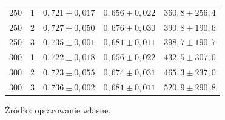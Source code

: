 \begin{table}[H]
{\begin{tabular}{llccc}
250 & 1 & $0{,}721 \pm 0{,}017$ & $0{,}656 \pm 0{,}022$ & $360{,}8 \pm 256{,}4$ \\
250 & 2 & $0{,}727 \pm 0{,}050$ & $0{,}676 \pm 0{,}030$ & $390{,}8 \pm 190{,}6$ \\
250 & 3 & $0{,}735 \pm 0{,}001$ & $0{,}681 \pm 0{,}011$ & $398{,}7 \pm 190{,}7$ \\
300 & 1 & $0{,}722 \pm 0{,}018$ & $0{,}656 \pm 0{,}022$ & $432{,}5 \pm 307{,}0$ \\
300 & 2 & $0{,}723 \pm 0{,}055$ & $0{,}674 \pm 0{,}031$ & $465{,}3 \pm 237{,}0$ \\
300 & 3 & $0{,}736 \pm 0{,}002$ & $0{,}681 \pm 0{,}011$ & $520{,}9 \pm 290{,}8$ \\
\hline
\end{tabular}}
\end{table}

Źródło: opracowanie własne.